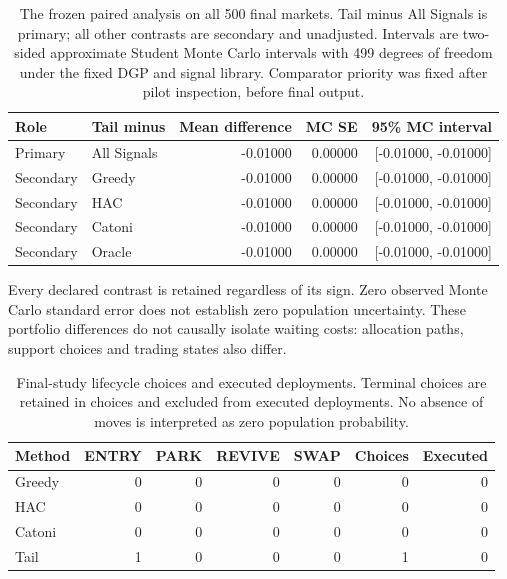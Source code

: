 \documentclass[11pt,a4paper]{article}
\theoremstyle{remark}\newtheorem{remark}[theorem]{Remark}
\begin{document}
\begin{table}[H]\centering\small

\begin{tabular}{llrrr}\toprule

Role & Tail minus & Mean difference & MC SE & 95\% MC interval \\\midrule

Primary & All Signals & -0.01000 & 0.00000 & [-0.01000, -0.01000] \\

Secondary & Greedy & -0.01000 & 0.00000 & [-0.01000, -0.01000] \\

Secondary & HAC & -0.01000 & 0.00000 & [-0.01000, -0.01000] \\

Secondary & Catoni & -0.01000 & 0.00000 & [-0.01000, -0.01000] \\

Secondary & Oracle & -0.01000 & 0.00000 & [-0.01000, -0.01000] \\

\bottomrule\end{tabular}

\caption{The frozen paired analysis on all 500 final markets. Tail minus All Signals is primary; all other contrasts are secondary and unadjusted. Intervals are two-sided approximate Student Monte Carlo intervals with 499 degrees of freedom under the fixed DGP and signal library. Comparator priority was fixed after pilot inspection, before final output.}\label{tab:final-contrasts}\end{table}

Every declared contrast is retained regardless of its sign. Zero observed Monte Carlo standard error does not establish zero population uncertainty. These portfolio differences do not causally isolate waiting costs: allocation paths, support choices and trading states also differ.

\begin{table}[H]\centering\small

\begin{tabular}{lrrrrrr}\toprule

Method & ENTRY & PARK & REVIVE & SWAP & Choices & Executed \\\midrule

Greedy & 0 & 0 & 0 & 0 & 0 & 0 \\

HAC & 0 & 0 & 0 & 0 & 0 & 0 \\

Catoni & 0 & 0 & 0 & 0 & 0 & 0 \\

Tail & 1 & 0 & 0 & 0 & 1 & 0 \\

\bottomrule\end{tabular}

\caption{Final-study lifecycle choices and executed deployments. Terminal choices are retained in choices and excluded from executed deployments. No absence of moves is interpreted as zero population probability.}\label{tab:final-lifecycles}\end{table}
\end{document}
